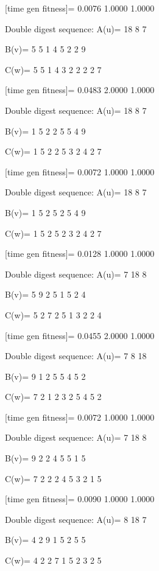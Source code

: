 [time gen fitness]=
    0.0076    1.0000    1.0000

Double digest sequence:
A(u)=
    18     8     7

B(v)=
     5     5     1     4     5     2     2     9

C(w)=
     5     5     1     4     3     2     2     2     2     7

[time gen fitness]=
    0.0483    2.0000    1.0000

Double digest sequence:
A(u)=
    18     8     7

B(v)=
     1     5     2     2     5     5     4     9

C(w)=
     1     5     2     2     5     3     2     4     2     7

[time gen fitness]=
    0.0072    1.0000    1.0000

Double digest sequence:
A(u)=
    18     8     7

B(v)=
     1     5     2     5     2     5     4     9

C(w)=
     1     5     2     5     2     3     2     4     2     7

[time gen fitness]=
    0.0128    1.0000    1.0000

Double digest sequence:
A(u)=
     7    18     8

B(v)=
     5     9     2     5     1     5     2     4

C(w)=
     5     2     7     2     5     1     3     2     2     4

[time gen fitness]=
    0.0455    2.0000    1.0000

Double digest sequence:
A(u)=
     7     8    18

B(v)=
     9     1     2     5     5     4     5     2

C(w)=
     7     2     1     2     3     2     5     4     5     2

[time gen fitness]=
    0.0072    1.0000    1.0000

Double digest sequence:
A(u)=
     7    18     8

B(v)=
     9     2     2     4     5     5     1     5

C(w)=
     7     2     2     2     4     5     3     2     1     5

[time gen fitness]=
    0.0090    1.0000    1.0000

Double digest sequence:
A(u)=
     8    18     7

B(v)=
     4     2     9     1     5     2     5     5

C(w)=
     4     2     2     7     1     5     2     3     2     5

